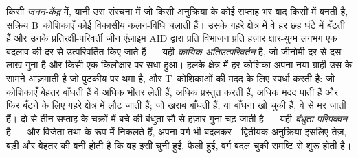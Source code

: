 \begin{definition}[जनन-केंद्र]\label{def:b3:adaptive-immunity:germinal-centre}
किसी \emph{जनन-केंद्र} में, यानी उस संरचना में जो किसी अनुक्रिया के कोई
सप्ताह भर बाद किसी  में बनती है, सक्रिय B~कोशिकाएँ कोई
विकासीय कलन-विधि चलाती हैं। उसके गहरे क्षेत्र में वे हर छह घंटे में
बँटती हैं और उनके प्रतिरक्षी-परिवर्ती जीन एंज़ाइम AID द्वारा प्रति
विभाजन प्रति हज़ार क्षार-युग्म लगभग एक बदलाव की दर से उत्परिवर्तित किए
जाते हैं --- यही \emph{कायिक अतिउत्परिवर्तन} है, जो जीनोमी दर से दस
लाख गुना है और किसी एक किलोक्षार पर सधा हुआ। हलके क्षेत्र में हर
कोशिका अपना नया ग्राही उस  के सामने आज़माती है जो पुटकीय  पर थमा है, और T~कोशिकाओं की मदद के लिए स्पर्धा करती है: जो
कोशिकाएँ बेहतर बाँधती हैं वे अधिक  भीतर लेती हैं, अधिक
प्रस्तुत करती हैं, अधिक मदद पाती हैं और फिर बँटने के लिए गहरे क्षेत्र
में लौट जाती हैं; जो खराब बाँधती हैं, या बाँधना खो चुकी हैं, वे
 से मर जाती हैं। दो से तीन सप्ताह के चक्रों में बचे
 की बंधुता सौ से हज़ार गुना चढ़ जाती है --- यही
\emph{बंधुता-परिपक्वन} है --- और विजेता  तथा  के रूप में निकलते हैं, अपना वर्ग भी बदलकर। द्वितीयक अनुक्रिया
इसलिए तेज़, बड़ी और बेहतर  की बनी होती है कि वह इसी चुनी हुई,
फैली हुई, वर्ग बदल चुकी समष्टि से शुरू होती है।
\end{definition}

